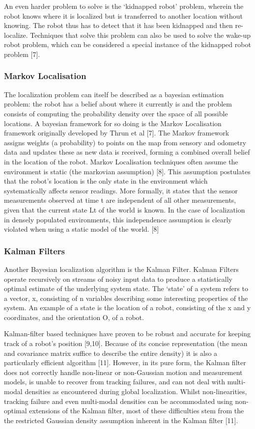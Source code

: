 \documentclass{article}
\begin{document}
\begin{multicols}{2}
An even harder problem to solve is the ‘kidnapped robot’ problem, wherein the robot  knows where it is localized but is transferred to another location without knowing. The robot thus has to detect that it has been kidnapped and then re-localize. Techniques that solve this problem can also be used to solve the wake-up robot problem, which can be considered a special instance of the kidnapped robot problem [7].

	\subsubsection{Markov Localisation}
	The localization problem can itself be described as a bayesian estimation problem: the robot has a belief about where it currently is and the problem consists of computing the probability density over the space of all possible locations. A bayesian framework for so doing is the Markov Localisation framework originally developed by Thrun et al [7]. The Markov framework assigns weights (a probability) to points on the map from sensory and odometry data and updates these as new data is received, forming a combined overall belief in the location of the robot. Markov Localisation techniques often assume the environment is static (the markovian assumption) [8]. This assumption postulates that the robot's location is the only state in the environment which systematically affects sensor readings. More formally, it states that the sensor measurements observed at time t are independent of all other measurements, given that the current state Lt of the world is known. In the case of localization in densely populated environments, this independence assumption is clearly violated when using a static model of the world. [8]

	\subsubsection{Kalman Filters}
	Another Bayesian localization algorithm is the Kalman Filter. Kalman Filters operate recursively on streams of noisy input data to produce a statistically optimal estimate of the underlying system state. The ‘state’ of a system refers to a vector, x, consisting of n variables describing some interesting properties of the system. An example of a state is the location of a robot, consisting of the x and y coordinates, and the orientation O, of a robot.

	Kalman-filter based techniques have proven to be robust and accurate for keeping track of a robot’s position [9,10]. Because of its concise representation (the mean and covariance matrix suffice to describe the entire density) it is also a particularly efficient algorithm [11]. However, in its pure form, the Kalman filter does not correctly handle non-linear or non-Gaussian motion and measurement models, is unable to recover from tracking failures, and can not deal with multi-modal densities as encountered during global localization. Whilst non-linearities, tracking failure and even multi-modal densities can be accommodated using non-optimal extensions of the Kalman filter, most of these difficulties stem from the the restricted Gaussian density assumption inherent in the Kalman filter [11].


\end{multicols}
\end{document}
